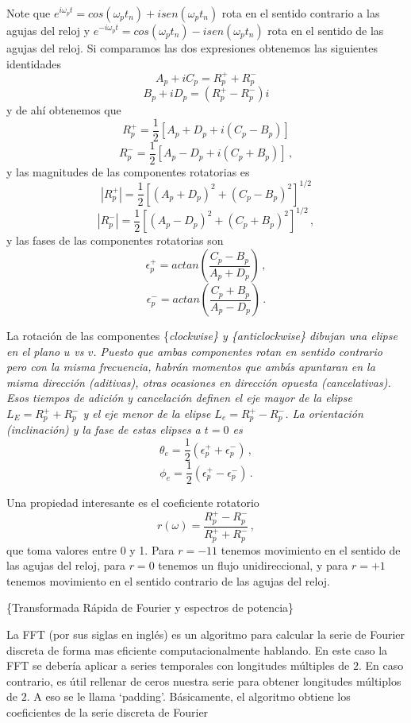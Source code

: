 \documentclass[
]{agujournal2019}
\begin{document}
Note que
\(e^{i\omega_p t}=cos\left(\omega_p t_n\right) + i sen\left(\omega_p t_n\right)\)
rota en el sentido contrario a las agujas del reloj y
\(e^{-i\omega_p t}=cos\left(\omega_p t_n\right) - i sen\left(\omega_p t_n\right)\)
rota en el sentido de las agujas del reloj. Si comparamos las dos
expresiones obtenemos las siguientes identidades
\[A_{p} + i C_{p}=R_p^+ + R_p^{-}\]
\[B_{p} + i D_{p}=(R_p^+ - R_p^{-})i\] y de ahí obtenemos que
\[R_p^+=\frac{1}{2}\left[ A_{p} + D_{p} +i(C_{p}-B_{p})\right]\]
\[R_p^-=\frac{1}{2}\left[ A_{p} - D_{p} +i(C_{p}+B_{p})\right]\,,\] y
las magnitudes de las componentes rotatorias es
\[|R_p^+|=\frac{1}{2}\left[ (A_{p} + D_{p})^2 +(C_{p}-B_{p})^2\right]^{1/2}\]
\[|R_p^-|=\frac{1}{2}\left[ (A_{p} - D_{p})^2 +(C_{p}+B_{p})^2\right]^{1/2}\,,\]
y las fases de las componentes rotatorias son
\[\epsilon_p^+=actan\left(\frac{C_{p}-B_{p}}{A_{p} + D_{p}}\right)\,,\]
\[\epsilon_p^-=actan\left(\frac{C_{p}+B_{p}}{A_{p} - D_{p}}\right)\,.\]

La rotación de las componentes \{\it clockwise\} y \{\it anticlockwise\}
dibujan una elipse en el plano \(u\) vs \(v\). Puesto que ambas
componentes rotan en sentido contrario pero con la misma frecuencia,
habrán momentos que ambás apuntaran en la misma dirección (aditivas),
otras ocasiones en dirección opuesta (cancelativas). Esos tiempos de
adición y cancelación definen el eje mayor de la elipse
\(L_E=R_p^+ + R_p^-\) y el eje menor de la elipse \(L_e=R_p^+ - R_p^-\).
La orientación (inclinación) y la fase de estas elipses a \(t=0\) es
\[\theta_e=\frac{1}{2}(\epsilon_p^+ + \epsilon_p^-)\,,\]
\[\phi_e=\frac{1}{2}(\epsilon_p^+ - \epsilon_p^-)\,.\]

Una propiedad interesante es el coeficiente rotatorio
\[r(\omega)=\frac{R^+_p - R^-_p}{R^+_p + R^-_p}\,,\] que toma valores
entre 0 y 1. Para \(r=-11\) tenemos movimiento en el sentido de las
agujas del reloj, para \(r=0\) tenemos un flujo unidireccional, y para
\(r=+1\) tenemos movimiento en el sentido contrario de las agujas del
reloj.

\vspace{0.5cm}

\{\textbf \large \noindent Transformada Rápida de Fourier y espectros de
potencia\}

La FFT (por sus siglas en inglés) es un algoritmo para calcular la serie
de Fourier discreta de forma mas eficiente computacionalmente hablando.
En este caso la FFT se debería aplicar a series temporales con
longitudes múltiples de \(2\). En caso contrario, es útil rellenar de
ceros nuestra serie para obtener longitudes múltiplos de \(2\). A eso se
le llama `padding'. Básicamente, el algoritmo obtiene los coeficientes
de la serie discreta de Fourier
\end{document}
